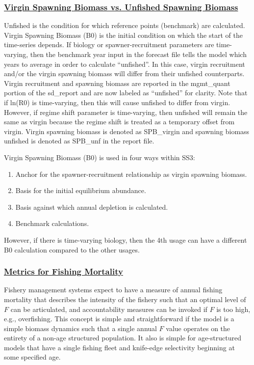 \subsubsection[Virgin Spawning Biomass vs. Unfished Spawning Biomass]{\protect\hyperlink{VirginUnfishedVirginUnfished}{Virgin Spawning Biomass vs. Unfished Spawning Biomass}}
Unfished is the condition for which reference points (benchmark) are calculated. Virgin Spawning Biomass (B0) is the initial condition on which the start of the time-series depends. If biology or spawner-recruitment parameters are time-varying, then the benchmark year input in the forecast file tells the model which years to average in order to calculate ``unfished''. In this case, virgin recruitment and/or the virgin spawning biomass will differ from their unfished counterparts. Virgin recruitment and spawning biomass are reported in the mgmt\_quant portion of the sd\_report and are now labeled as ``unfished'' for clarity. Note that if ln(R0) is time-varying, then this will cause unfished to differ from virgin. However, if regime shift parameter is time-varying, then unfished will remain the same as virgin because the regime shift is treated as a temporary offset from virgin. Virgin spawning biomass is denoted as SPB\_virgin and spawning biomass unfished is denoted as SPB\_unf in the report file.

Virgin Spawning Biomass (B0) is used in four ways within SS3:
\begin{enumerate}
	\item Anchor for the spawner-recruitment relationship as virgin spawning biomass.
	\item Basis for the initial equilibrium abundance. 
	\item Basis against which annual depletion is calculated.
	\item Benchmark calculations.
\end{enumerate}
However, if there is time-varying biology, then the 4th usage can have a different B0 calculation compared to the other usages.

\hypertarget{FMortality}{}
\subsubsection[Metrics for Fishing Mortality]{\protect\hyperlink{FMortality}{Metrics for Fishing Mortality}}
Fishery management systems expect to have a measure of annual fishing mortality that describes the intensity of the fishery such that an optimal level of $F$ can be articulated, and accountability measures can be invoked if $F$ is too high, e.g., overfishing. This concept is simple and straightforward if the model is a simple biomass dynamics such that a single annual $F$ value operates on the entirety of a non-age structured population. It also is simple for age-structured models that have a single fishing fleet and knife-edge selectivity beginning at some specified age.

